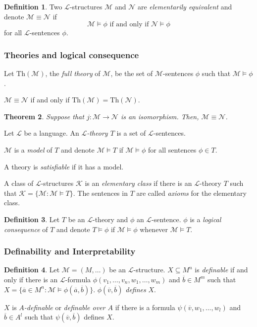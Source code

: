 \documentclass{amsart}
\newtheorem{theorem}{Theorem}[subsection]
\theoremstyle{definition}
\newtheorem{definition}[theorem]{Definition}
\numberwithin{equation}{section}
\begin{document}
\begin{definition}
  Two $\mathcal{L}$-structures $\mathcal{M}$ and $\mathcal{N}$ are \emph{elementarily equivalent}
  and denote $\mathcal{M} \equiv \mathcal{N}$ if
  \[
    \mathcal{M} \models \phi \text{ if and only if }\mathcal{N} \models \phi
  \]
  for all $\mathcal{L}$-sentences $\phi$.
\end{definition}

\subsubsection{Theories and logical consequence}
Let $\mathrm{Th}(\mathcal{M})$, the \emph{full theory} of $\mathcal{M}$,
be the set of $\mathcal{M}$-sentences $\phi$ such that $\mathcal{M} \models \phi$.

$\mathcal{M} \equiv \mathcal{N}$ if and only if $\mathrm{Th}(\mathcal{M}) = \mathrm{Th}(\mathcal{N})$.

\begin{theorem}
  Suppose that $j: \mathcal{M} \to \mathcal{N}$ is an isomorphism.
  Then, $\mathcal{M} \equiv \mathcal{N}$.
\end{theorem}

Let $\mathcal{L}$ be a language.
An \emph{$\mathcal{L}$-theory $T$} is a set of $\mathcal{L}$-sentences.

$\mathcal{M}$ is a \emph{model} of $T$ and denote $\mathcal{M} \models T$ if $\mathcal{M} \models \phi$ for all sentences $\phi \in T$.

A theory is \emph{satisfiable} if it has a model.

A class of $\mathcal{L}$-structures $\mathcal{K}$ is an \emph{elementary class}
if there is an $\mathcal{L}$-theory $T$ such that $\mathcal{K} = \{ \mathcal{M}:\mathcal{M} \models T \}$.
The sentences in $T$ are called \emph{axioms} for the elementary class.

\begin{definition}
  Let $T$ be an $\mathcal{L}$-theory and $\phi$ an $\mathcal{L}$-sentence.
  $\phi$ is a \emph{logical consequence} of $T$ and denote $T \models \phi$ if $\mathcal{M} \models \phi$
  whenever $\mathcal{M} \models T$.
\end{definition}

\subsubsection{Definability and Interpretability}
\begin{definition}
  Let $\mathcal{M} = (M,\dots)$ be an $\mathcal{L}$-structure.
  $X \subseteq M^n$ is \emph{definable} if and only if there is an $\mathcal{L}$-formula $\phi(v_1,\dots,v_n,w_1,\dots,w_m)$
  and $\overline{b} \in M^m$ such that $X = \{ \overline{a} \in M^n : \mathcal{M} \models \phi(\overline{a},\overline{b}) \}$.
  $\phi(\overline{v},\overline{b})$ \emph{defines} $X$.

  $X$ is \emph{$A$-definable }or \emph{definable over $A$} if there is a formula $\psi(\overline{v},w_1,\dots,w_l)$ and
  $\overline{b} \in A^l$ such that $\psi(\overline{v},\overline{b})$ defines $X$.
\end{definition}
\end{document}
